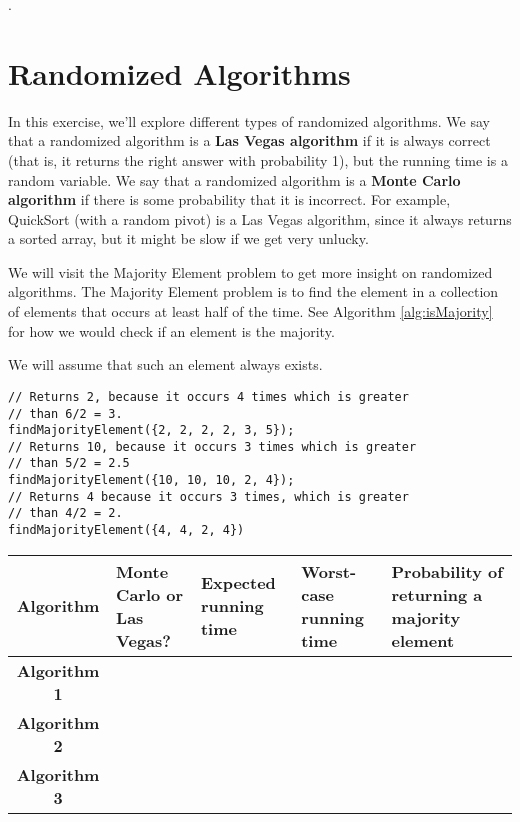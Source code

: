\documentclass [12pt]{article}
\begin{document}
.

\pagebreak
\section {Randomized Algorithms } 
\label{sec:last}

In this exercise, we'll explore different types of randomized algorithms. We say that a randomized algorithm is a \textbf {Las Vegas algorithm} if it is always correct (that is, it returns the right answer with probability 1), but the running time is a random variable. We say that a randomized algorithm is a \textbf {Monte Carlo algorithm} if there is some probability that it is incorrect. For example, QuickSort (with a random pivot) is a Las Vegas algorithm, since it always returns a sorted array, but it might be slow if we get very unlucky. 

We will visit the Majority Element problem to get more insight on randomized algorithms. The Majority Element problem is to find the element in a collection of elements that occurs at least half of the time. See Algorithm \ref{alg:isMajority} for how we would check if an element is the majority.

We will assume that such an element always exists.

\vspace{2em}
\begin{verbatim}
// Returns 2, because it occurs 4 times which is greater
// than 6/2 = 3.
findMajorityElement({2, 2, 2, 2, 3, 5});
// Returns 10, because it occurs 3 times which is greater
// than 5/2 = 2.5
findMajorityElement({10, 10, 10, 2, 4});
// Returns 4 because it occurs 3 times, which is greater
// than 4/2 = 2.
findMajorityElement({4, 4, 2, 4})
\end{verbatim}

\vspace{2em}
\begin{center} 
\begin{tabular}{|c|p{3cm}|p{2cm}|p{2cm}|p{4cm}|}
\hline 
Algorithm & Monte Carlo or Las Vegas? & Expected running time & Worst-case running time & Probability of returning a majority element \\
\hline 
\textbf {Algorithm 1} & & & & \\ 
\hline 
\textbf {Algorithm 2} & & & & \\
\hline 
\textbf {Algorithm 3} & & & & \\ 
\hline 
\end{tabular}
\end{center}
\end{document}

